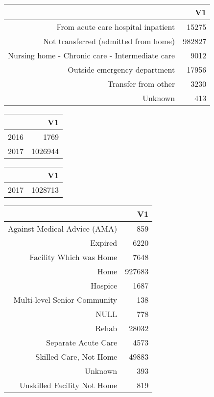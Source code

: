 \bigskip\bigskip
\centering
\begin{tabular}{rr}
  \hline
 & V1 \\ 
  \hline
From acute care hospital inpatient & 15275 \\ 
  Not transferred (admitted from home) & 982827 \\ 
  Nursing home - Chronic care - Intermediate care & 9012 \\ 
  Outside emergency department & 17956 \\ 
  Transfer from other & 3230 \\ 
  Unknown & 413 \\ 
   \hline
\end{tabular}

\bigskip\bigskip
\centering
\begin{tabular}{rr}
  \hline
 & V1 \\ 
  \hline
2016 & 1769 \\ 
  2017 & 1026944 \\ 
   \hline
\end{tabular}

\bigskip\bigskip
\centering
\begin{tabular}{rr}
  \hline
 & V1 \\ 
  \hline
2017 & 1028713 \\ 
   \hline
\end{tabular}

\bigskip\bigskip
\centering
\begin{tabular}{rr}
  \hline
 & V1 \\ 
  \hline
Against Medical Advice (AMA) & 859 \\ 
  Expired & 6220 \\ 
  Facility Which was Home & 7648 \\ 
  Home & 927683 \\ 
  Hospice & 1687 \\ 
  Multi-level Senior Community & 138 \\ 
  NULL & 778 \\ 
  Rehab & 28032 \\ 
  Separate Acute Care & 4573 \\ 
  Skilled Care, Not Home & 49883 \\ 
  Unknown & 393 \\ 
  Unskilled Facility Not Home & 819 \\ 
   \hline
\end{tabular}

